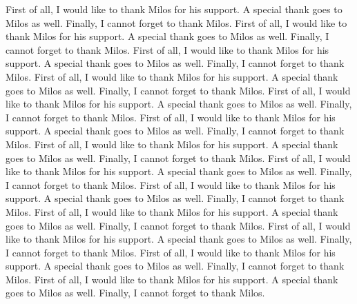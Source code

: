 \begin{acknowledgement}
First of all, I would like to thank Milos for his support. A special thank goes to Milos as well. Finally, I cannot forget to thank Milos. First of all, I would like to thank Milos for his support. A special thank goes to Milos as well. Finally, I cannot forget to thank Milos. First of all, I would like to thank Milos for his support. A special thank goes to Milos as well. Finally, I cannot forget to thank Milos. First of all, I would like to thank Milos for his support. A special thank goes to Milos as well. Finally, I cannot forget to thank Milos. First of all, I would like to thank Milos for his support. A special thank goes to Milos as well. Finally, I cannot forget to thank Milos. First of all, I would like to thank Milos for his support. A special thank goes to Milos as well. Finally, I cannot forget to thank Milos. First of all, I would like to thank Milos for his support. A special thank goes to Milos as well. Finally, I cannot forget to thank Milos. First of all, I would like to thank Milos for his support. A special thank goes to Milos as well. Finally, I cannot forget to thank Milos. First of all, I would like to thank Milos for his support. A special thank goes to Milos as well. Finally, I cannot forget to thank Milos. First of all, I would like to thank Milos for his support. A special thank goes to Milos as well. Finally, I cannot forget to thank Milos. First of all, I would like to thank Milos for his support. A special thank goes to Milos as well. Finally, I cannot forget to thank Milos. First of all, I would like to thank Milos for his support. A special thank goes to Milos as well. Finally, I cannot forget to thank Milos. First of all, I would like to thank Milos for his support. A special thank goes to Milos as well. Finally, I cannot forget to thank Milos.  
\end{acknowledgement}